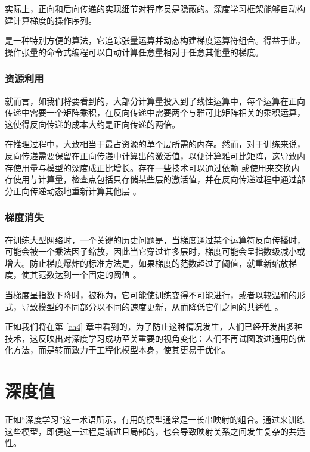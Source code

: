 实际上，正向和后向传递的实现细节对程序员是隐蔽的。深度学习框架能够自动构建计算梯度的操作序列。

 \citep{arxiv-1502.05767} 是一种特别方便的算法，它追踪张量运算并动态构建梯度运算符组合。得益于此，操作张量的命令式编程可以自动计算任意量相对于任意其他量的梯度。

\subsubsection*{资源利用}

就而言，如我们将要看到的，大部分计算量投入到了线性运算中，每个运算在正向传递中需要一个矩阵乘积，在反向传递中需要两个与雅可比矩阵相关的乘积运算，这使得反向传递的成本大约是正向传递的两倍。

在推理过程中，大致相当于最占资源的单个层所需的内存。然而，对于训练来说，反向传递需要保留在正向传递中计算出的激活值，以便计算雅可比矩阵，这导致内存使用量与模型的深度成正比增长。存在一些技术可以通过依赖 \citep{arxiv-1707.04585} 或使用来交换内存使用与计算量，检查点包括只存储某些层的激活值，并在反向传递过程中通过部分正向传递动态地重新计算其他层 \citep{arxiv-1604.06174}。

\subsubsection*{梯度消失}

在训练大型网络时，一个关键的历史问题是，当梯度通过某个运算符反向传播时，可能会被一个乘法因子缩放，因此当它穿过许多层时，梯度可能会呈指数级减小或增大。防止梯度爆炸的标准方法是，如果梯度的范数超过了阈值，就重新缩放梯度，使其范数达到一个固定的阈值 \citep{pascanu13}。

当梯度呈指数下降时，被称为，它可能使训练变得不可能进行，或者以较温和的形式，导致模型的不同部分以不同的速度更新，从而降低它们之间的共适性 \citep{glorot10a}。

正如我们将在第 \ref{ch4} 章中看到的，为了防止这种情况发生，人们已经开发出多种技术，这反映出对深度学习成功至关重要的视角变化：人们不再试图改进通用的优化方法，而是转而致力于工程化模型本身，使其更易于优化。

\section{深度值}\label{sec3.5}

正如``深度学习''这一术语所示，有用的模型通常是一长串映射的组合。通过来训练这些模型，即便这一过程是渐进且局部的，也会导致映射关系之间发生复杂的共适性。

